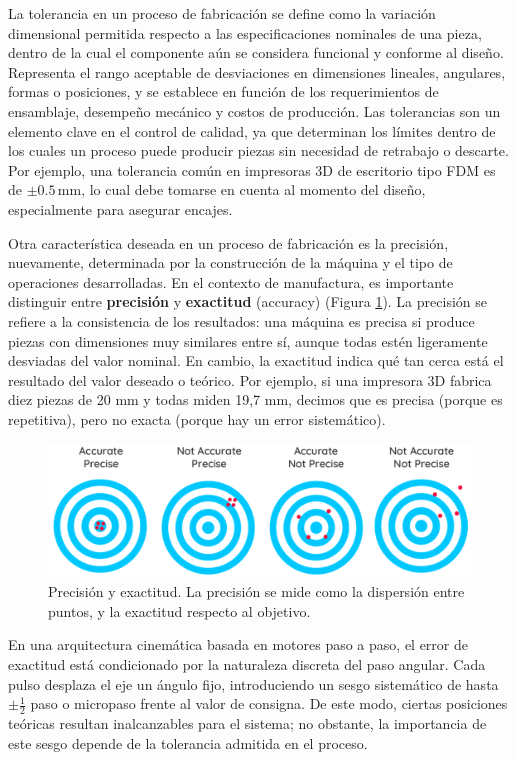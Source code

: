 La tolerancia en un proceso de fabricación se define como la variación dimensional permitida respecto a las especificaciones nominales de una pieza, dentro de la cual el componente aún se considera funcional y conforme al diseño. Representa el rango aceptable de desviaciones en dimensiones lineales, angulares, formas o posiciones, y se establece en función de los requerimientos de ensamblaje, desempeño mecánico y costos de producción. Las tolerancias son un elemento clave en el control de calidad, ya que determinan los límites dentro de los cuales un proceso puede producir piezas sin necesidad de retrabajo o descarte. Por ejemplo, una tolerancia común en impresoras 3D de escritorio tipo FDM es de $\pm 0.5 \,\mathrm{mm}$, lo cual debe tomarse en cuenta al momento del diseño, especialmente para asegurar encajes.

Otra característica deseada en un proceso de fabricación es la precisión, nuevamente, determinada por la construcción de la máquina y el tipo de operaciones desarrolladas. En el contexto de manufactura, es importante distinguir entre \textbf{precisión} y \textbf{exactitud} (accuracy) (Figura \ref{press1}). La precisión se refiere a la consistencia de los resultados: una máquina es precisa si produce piezas con dimensiones muy similares entre sí, aunque todas estén ligeramente desviadas del valor nominal. En cambio, la exactitud indica qué tan cerca está el resultado del valor deseado o teórico. Por ejemplo, si una impresora 3D fabrica diez piezas de 20 mm y todas miden 19,7 mm, decimos que es precisa (porque es repetitiva), pero no exacta (porque hay un error sistemático).

\begin{figure}[h!]
    \centering
    \includegraphics[width=0.9\linewidth]{imgs/press.png}
    \caption{Precisión y exactitud. La precisión se mide como la dispersión entre puntos, y la exactitud respecto al objetivo.}
    \label{press1}
\end{figure}

En una arquitectura cinemática basada en motores paso a paso, el error de exactitud está condicionado por la naturaleza discreta del paso angular. Cada pulso desplaza el eje un ángulo fijo, introduciendo un sesgo sistemático de hasta $\pm \tfrac{1}{2}$ paso o micropaso frente al valor de consigna. De este modo, ciertas posiciones teóricas resultan inalcanzables para el sistema; no obstante, la importancia de este sesgo depende de la tolerancia admitida en el proceso.

